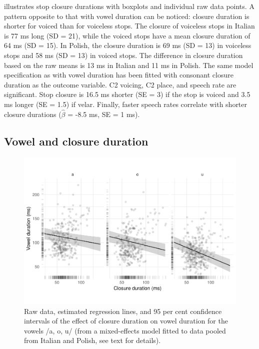 \documentclass[12pt,]{article}
\begin{document}
 illustrates stop closure durations with boxplots and
individual raw data points. A pattern opposite to that with vowel
duration can be noticed: closure duration is shorter for voiced than for
voiceless stops. The closure of voiceless stops in Italian is 77 ms long
(SD = 21), while the voiced stops have a mean closure duration of 64 ms
(SD = 15). In Polish, the closure duration is 69 ms (SD = 13) in
voiceless stops and 58 ms (SD = 13) in voiced stops. The difference in
closure duration based on the raw means is 13 ms in Italian and 11 ms in
Polish. The same model specification as with vowel duration has been
fitted with consonant closure duration as the outcome variable. C2
voicing, C2 place, and speech rate are significant. Stop closure is 16.5
ms shorter (SE = 3) if the stop is voiced and 3.5 ms longer (SE = 1.5)
if velar. Finally, faster speech rates correlate with shorter closure
durations (\(\hat{\beta}\) = -8.5 ms, SE = 1 ms).

\hypertarget{vowel-and-closure-duration}{%
\subsection{Vowel and closure
duration}\label{vowel-and-closure-duration}}

\label{s:vcduration}

\begin{figure}
\includegraphics[width=\linewidth]{2018-relrel_files/figure-latex/Figure4} \caption{Raw data, estimated regression lines, and 95 per cent confidence intervals of the effect of closure duration on vowel duration for the vowels /a, o, u/ (from a mixed-effects model fitted to data pooled from Italian and Polish, see text for details).}\label{f:Figure4}
\end{figure}
\end{document}
